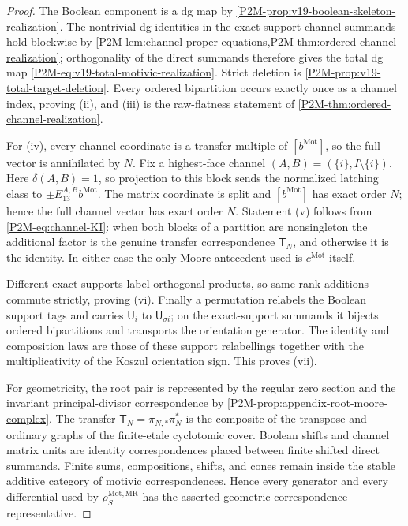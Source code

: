 \documentclass[11pt]{article}
\theoremstyle{remark}
\newcommand{\Mot}{\mathrm{Mot}}
\newcommand{\MR}{\mathrm{MR}}
\begin{document}
\begin{proof}
The Boolean component is a dg map by
\cref{P2M-prop:v19-boolean-skeleton-realization}.  The nontrivial dg identities in
the exact-support channel summands hold blockwise by
\cref{P2M-lem:channel-proper-equations,P2M-thm:ordered-channel-realization}; orthogonality
of the direct summands therefore gives the total dg map
\eqref{P2M-eq:v19-total-motivic-realization}.  Strict deletion is
\cref{P2M-prop:v19-total-target-deletion}.  Every ordered
bipartition occurs exactly once as a channel index, proving (ii), and (iii) is
the raw-flatness statement of \cref{P2M-thm:ordered-channel-realization}.

For (iv), every channel coordinate is a transfer multiple of
$[b^{\Mot}]$, so the full vector is annihilated by $N$.  Fix a highest-face
channel $(A,B)=(\{i\},I\setminus\{i\})$.  Here $\delta(A,B)=1$, so
projection to this block sends the normalized latching class to
$\pm E_{13}^{A,B}b^{\Mot}$.  The matrix coordinate is split and
$[b^{\Mot}]$ has exact order $N$; hence the full channel vector has exact
order $N$.  Statement (v) follows from \eqref{P2M-eq:channel-KI}: when both
blocks of a partition are nonsingleton the additional factor is the genuine
transfer correspondence $\mathsf T_N$, and otherwise it is the identity.
In either case the only Moore antecedent used is $c^{\Mot}$ itself.

Different exact supports label orthogonal products, so same-rank additions
commute strictly, proving (vi).  Finally a permutation relabels the Boolean support tags and carries $\mathsf U_i$ to $\mathsf U_{\sigma i}$; on the exact-support summands it bijects ordered
bipartitions and transports the orientation generator.  The identity and
composition laws are those of these support relabellings together with the
multiplicativity of the Koszul orientation sign.  This proves (vii).

For geometricity, the root pair is represented by the regular zero section and
the invariant principal-divisor correspondence by
\cref{P2M-prop:appendix-root-moore-complex}.  The transfer
\(\mathsf T_N=\pi_{N,*}\pi_N^*\) is the composite of the transpose and ordinary
graphs of the finite-etale cyclotomic cover.  Boolean shifts and channel matrix
units are identity correspondences placed between finite shifted direct
summands.  Finite sums, compositions, shifts, and cones remain inside the
stable additive category of motivic correspondences.  Hence every generator
and every differential used by \(\rho_S^{\Mot,\MR}\) has the asserted
geometric correspondence representative.
\end{proof}
\end{document}
